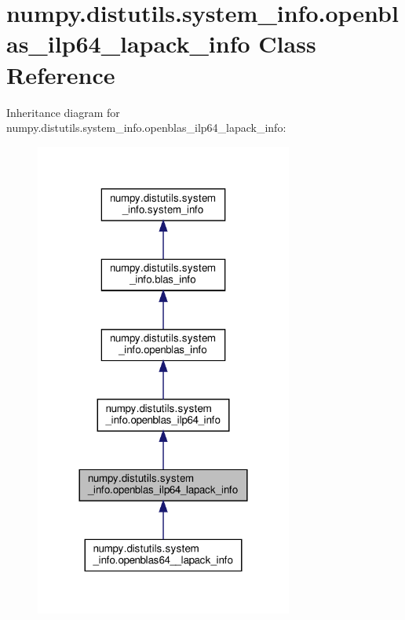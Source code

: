 \hypertarget{classnumpy_1_1distutils_1_1system__info_1_1openblas__ilp64__lapack__info}{}\section{numpy.\+distutils.\+system\+\_\+info.\+openblas\+\_\+ilp64\+\_\+lapack\+\_\+info Class Reference}
\label{classnumpy_1_1distutils_1_1system__info_1_1openblas__ilp64__lapack__info}


Inheritance diagram for numpy.\+distutils.\+system\+\_\+info.\+openblas\+\_\+ilp64\+\_\+lapack\+\_\+info\+:
\nopagebreak
\begin{figure}[H]
\begin{center}
\leavevmode
\includegraphics[width=240pt]{classnumpy_1_1distutils_1_1system__info_1_1openblas__ilp64__lapack__info__inherit__graph}
\end{center}
\end{figure}



